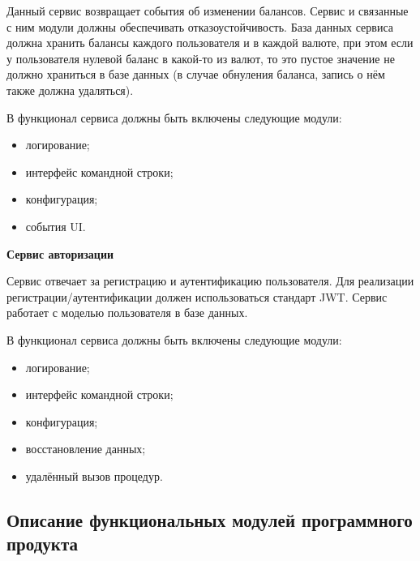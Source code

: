 Данный сервис возвращает события об изменении балансов. Сервис и связанные с ним модули должны обеспечивать отказоустойчивость. База данных сервиса должна хранить балансы каждого пользователя и в каждой валюте, при этом если у пользователя нулевой баланс в какой-то из валют, то это пустое значение не должно храниться в базе данных (в случае обнуления баланса, запись о нём также должна удаляться).

В функционал сервиса должны быть включены следующие модули:
\begin{itemize}
    \item логирование;
    \item интерфейс командной строки;
    \item конфигурация;
    \item события UI.
\end{itemize}


\textbf{Сервис авторизации}

Сервис отвечает за регистрацию и аутентификацию пользователя. Для реализации регистрации/аутентификации должен использоваться стандарт JWT. Сервис работает с моделью пользователя в базе данных.

В функционал сервиса должны быть включены следующие модули:
\begin{itemize}
    \item логирование;
    \item интерфейс командной строки;
    \item конфигурация;
    \item восстановление данных;
    \item удалённый вызов процедур.
\end{itemize}

\subsection{Описание функциональных модулей программного продукта}\label{sec:domain:func}

